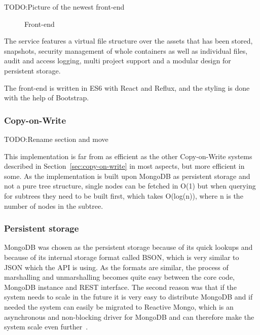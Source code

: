 \documentclass[a4paper,12pt]{article}
\newcounter{subsubsubsection}[subsubsection]
\newcommand{\fix}{\colorbox{yellow!30}{TODO:}}
\begin{document}
\fix Picture of the newest front-end
\begin{figure}[htp] 
    \caption{Front-end~\cite{BTRFS}}
    \label{fig:frontend}
\end{figure}


The service features a virtual file structure over the assets that has been stored, snapshots,
security management of whole containers as well as individual files, audit and access logging, multi
project support and a modular design for persistent storage.

The front-end is written in ES6 with React and Reflux, and the styling is done with the help of
Bootstrap.

\subsubsection{Copy-on-Write}
\fix Rename section and move

This implementation is far from as efficient as the other Copy-on-Write systems described in
Section~\ref{sec:copy-on-write} in most aspects, but more efficient in some. As the implementation
is built upon MongoDB as persistent storage and not a pure tree structure, single nodes can be
fetched in O(1) but when querying for subtrees they need to be built first, which takes O(log(n)),
where n is the number of nodes in the subtree. 

\subsubsection{Persistent storage}
\label{persistent_storage}
MongoDB was chosen as the persistent storage because of its quick lookups and because of its
internal storage format called BSON, which is very similar to JSON which the API is using. As the
formats are similar, the process of marshalling and unmarshalling becomes quite easy between the
core code, MongoDB instance and REST interface.  The second reason was that if the system needs to
scale in the future it is very easy to distribute MongoDB and if needed the system can easily be
migrated to Reactive Mongo, which is an asynchronous and non-blocking driver for MongoDB and can
therefore make the system scale even further~\cite{REACTIVEMONGO}.
\end{document}
